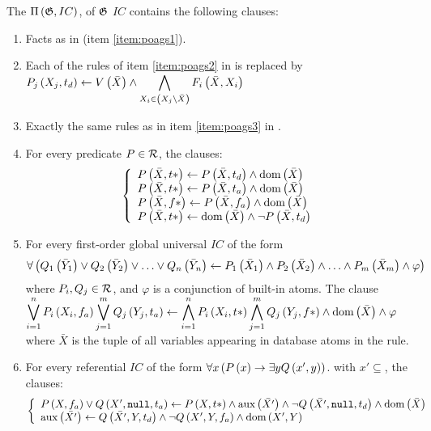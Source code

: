 \begin{defi}
The  $\Pi\left(\mathfrak{G},IC\right)$, of $\mathfrak{G}$ \wrtTx{} $IC$ contains the following clauses:
\begin{enumerate}
\item Facts as in  (item \ref{item:poags1}).
\item Each of the rules of item \ref{item:poags2} in  is replaced by $P_j\left(X_j,t_d\right)\leftarrow V\left(\bar{X}\right)\wedge\displaystyle\bigwedge_{X_i\in\left( X_j\setminus\bar{X}\right)}F_i\left(\bar{X},X_i\right)$
\item Exactly the same rules as in item \ref{item:poags3} in .
\item For every predicate $P\in\mathcal{R}$, the clauses:
\begin{equation}
\left\{\begin{array}{l}P\left(\bar{X},t*\right)\leftarrow P\left(\bar{X},t_d\right)\wedge\mbox{dom}\left(\bar{X}\right)\\
P\left(\bar{X},t*\right)\leftarrow P\left(\bar{X},t_a\right)\wedge\mbox{dom}\left(\bar{X}\right)\\
P\left(\bar{X},f*\right)\leftarrow P\left(\bar{X},f_a\right)\wedge\mbox{dom}\left(\bar{X}\right)\\
P\left(\bar{X},t*\right)\leftarrow\mbox{dom}\left(\bar{X}\right)\wedge\neg P\left(\bar{X},t_d\right)\end{array}\right.
\end{equation}
\item For every first-order global universal $IC$ of the form
\begin{equation}
\forall\left( Q_1\left(\bar{Y}_1\right)\vee Q_2\left(\bar{Y}_2\right)\vee\ldots\vee Q_n\left(\bar{Y}_n\right)\leftarrow P_1\left(\bar{X}_1\right)\wedge P_2\left(\bar{X}_2\right)\wedge\ldots\wedge P_m\left(\bar{X}_m\right)\wedge\varphi\right)
\end{equation}
where $P_i,Q_j\in\mathcal{R}$, and $\varphi$ is a conjunction of built-in atoms. The clause $\displaystyle\bigvee_{i=1}^nP_i\left(X_i,f_a\right)\displaystyle\bigvee_{j=1}^mQ_j\left(Y_j,t_a\right)\leftarrow\displaystyle\bigwedge_{i=1}^nP_i\left(X_i,t*\right)\displaystyle\bigwedge_{j=1}^mQ_j\left(Y_j,f*\right)\wedge\mbox{dom}\left(\bar{X}\right)\wedge\varphi$ where $\bar{X}$ is the tuple of all variables appearing in database
atoms in the rule.
\item For every referential $IC$ of the form $\forall x\left( P\left(x\right)\rightarrow\exists yQ\left(x',y\right)\right)$. with $x'\subseteq$, the clauses:
\begin{equation}
\left\{\begin{array}{l}P\left(X,f_a\right)\vee Q\left(X',\mbox{\tt null},t_a\right)\leftarrow P\left(X,t*\right)\wedge\mbox{aux}\left(\bar{X'}\right)\wedge\neg Q\left(\bar{X'},\mbox{\tt null},t_d\right)\wedge\mbox{dom}\left(\bar{X}\right)\\
\mbox{aux}\left(\bar{X'}\right)\leftarrow Q\left(\bar{X'},Y,t_d\right)\wedge\neg Q\left(X',Y,f_a\right)\wedge\mbox{dom}\left(X',Y\right)\\
\end{array}\right.
\end{equation}
\end{enumerate}
\end{defi}
